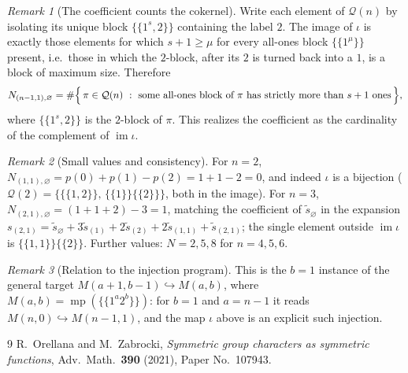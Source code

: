 \documentclass[11pt]{article}
\theoremstyle{remark}
\newtheorem{remark}{Remark}
\DeclareMathOperator{\msp}{mp}
\newcommand{\stil}{\widetilde{s}}
\newcommand{\ones}[1]{1^{#1}}
\begin{document}
\begin{remark}[The coefficient counts the cokernel]
Write each element of $\mathcal{Q}(n)$ by isolating its unique block
$\{\!\{\ones{s},2\}\!\}$ containing the label $2$. The image of $\iota$ is exactly
those elements for which $s+1\ge\mu$ for every all-ones block
$\{\!\{\ones{\mu}\}\!\}$ present, i.e.\ those in which the $2$-block, after its
$2$ is turned back into a $1$, is a block of maximum size. Therefore
\[
  N_{(n-1,1),\varnothing}
  = \#\Bigl\{\,\pi\in\mathcal{Q}(n)\ :\ \text{some all-ones block of }\pi
      \text{ has strictly more than } s+1 \text{ ones}\,\Bigr\},
\]
where $\{\!\{\ones{s},2\}\!\}$ is the $2$-block of $\pi$. This realizes the
coefficient as the cardinality of the complement of $\operatorname{im}\iota$.
\end{remark}

\begin{remark}[Small values and consistency]
For $n=2$, $N_{(1,1),\varnothing}=p(0)+p(1)-p(2)=1+1-2=0$, and indeed $\iota$ is a
bijection ($\mathcal{Q}(2)=\{\{\!\{1,2\}\!\},\,\{\!\{1\}\!\}\{\!\{2\}\!\}\}$, both
in the image). For $n=3$, $N_{(2,1),\varnothing}=(1+1+2)-3=1$, matching the
coefficient of $\stil_\varnothing$ in the expansion
$s_{(2,1)}=\stil_\varnothing+3\stil_{(1)}+2\stil_{(2)}+2\stil_{(1,1)}+\stil_{(2,1)}$;
the single element outside $\operatorname{im}\iota$ is
$\{\!\{1,1\}\!\}\{\!\{2\}\!\}$. Further values: $N=2,5,8$ for $n=4,5,6$.
\end{remark}

\begin{remark}[Relation to the injection program]
This is the $b=1$ instance of the general target
$M(a+1,b-1)\hookrightarrow M(a,b)$, where $M(a,b)=\msp(\{\!\{1^{a}2^{b}\}\!\})$: for
$b=1$ and $a=n-1$ it reads $M(n,0)\hookrightarrow M(n-1,1)$, and the map $\iota$
above is an explicit such injection.
\end{remark}

\begin{thebibliography}{9}
R.~Orellana and M.~Zabrocki,
\emph{Symmetric group characters as symmetric functions},
Adv.\ Math.\ \textbf{390} (2021), Paper No.\ 107943.
\end{thebibliography}
\end{document}
